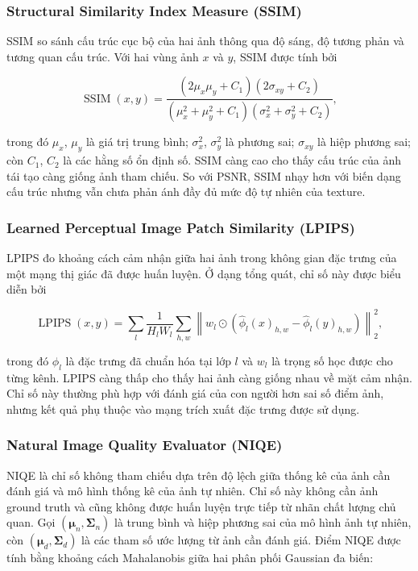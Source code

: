 \subsubsection{Structural Similarity Index Measure (SSIM)}

SSIM \cite{wang2004ssim} so sánh cấu trúc cục bộ của hai ảnh thông qua độ sáng, độ tương phản và
tương quan cấu trúc. Với hai vùng ảnh $x$ và $y$, SSIM được tính bởi

\begin{equation}
\operatorname{SSIM}(x,y)
=\frac{(2\mu_x\mu_y+C_1)(2\sigma_{xy}+C_2)}
{(\mu_x^2+\mu_y^2+C_1)(\sigma_x^2+\sigma_y^2+C_2)},
\end{equation}

trong đó $\mu_x$, $\mu_y$ là giá trị trung bình; $\sigma_x^2$, $\sigma_y^2$ là
phương sai; $\sigma_{xy}$ là hiệp phương sai; còn $C_1$, $C_2$ là các hằng số
ổn định số. SSIM càng cao cho thấy cấu trúc của ảnh tái tạo càng giống ảnh tham
chiếu. So với PSNR, SSIM nhạy hơn với biến dạng cấu trúc nhưng vẫn chưa phản ánh
đầy đủ mức độ tự nhiên của texture.

\subsubsection{Learned Perceptual Image Patch Similarity (LPIPS)}

LPIPS \cite{zhang2018lpips} đo khoảng cách cảm nhận giữa hai ảnh trong không gian đặc trưng của một
mạng thị giác đã được huấn luyện. Ở dạng tổng quát, chỉ số này được biểu diễn bởi

\begin{equation}
\operatorname{LPIPS}(x,y)
=\sum_l\frac{1}{H_lW_l}
\sum_{h,w}\left\|w_l\odot
\left(\hat{\phi}_l(x)_{h,w}-\hat{\phi}_l(y)_{h,w}\right)\right\|_2^2,
\end{equation}

trong đó $\hat{\phi}_l$ là đặc trưng đã chuẩn hóa tại lớp $l$ và $w_l$ là trọng
số học được cho từng kênh. LPIPS càng thấp cho thấy hai ảnh càng giống nhau về
mặt cảm nhận. Chỉ số này thường phù hợp với đánh giá của con người hơn sai số
điểm ảnh, nhưng kết quả phụ thuộc vào mạng trích xuất đặc trưng được sử dụng.

\subsubsection{Natural Image Quality Evaluator (NIQE)}

NIQE \cite{mittal2013niqe} là chỉ số không tham chiếu dựa trên độ lệch giữa thống kê của ảnh cần đánh
giá và mô hình thống kê của ảnh tự nhiên. Chỉ số này không cần ảnh ground truth
và cũng không được huấn luyện trực tiếp từ nhãn chất lượng chủ quan. Gọi
$(\boldsymbol{\mu}_n,\boldsymbol{\Sigma}_n)$ là trung bình và hiệp phương sai của
mô hình ảnh tự nhiên, còn $(\boldsymbol{\mu}_d,\boldsymbol{\Sigma}_d)$ là các
tham số ước lượng từ ảnh cần đánh giá. Điểm NIQE được tính bằng khoảng cách
Mahalanobis giữa hai phân phối Gaussian đa biến:

